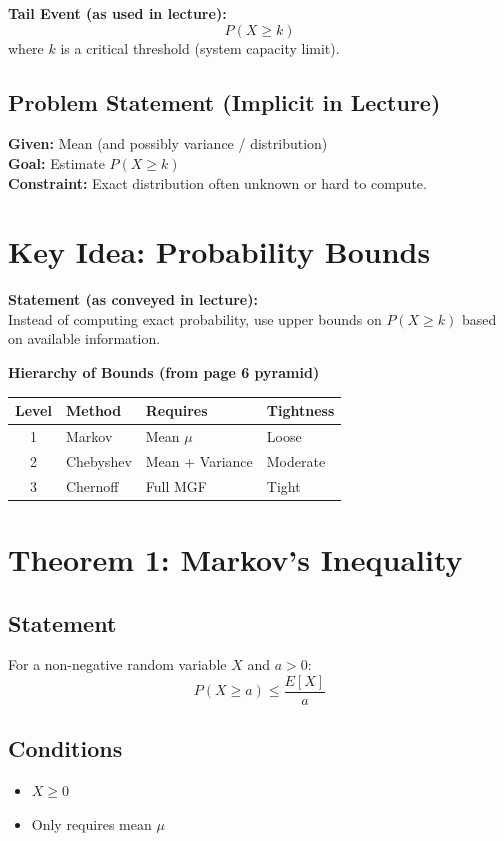 \documentclass[11pt]{article}
\begin{document}
\textbf{Tail Event (as used in lecture):}
\[ P(X \ge k) \]
where $k$ is a critical threshold (system capacity limit).

\subsection{Problem Statement (Implicit in Lecture)}
\textbf{Given:} Mean (and possibly variance / distribution) \\
\textbf{Goal:} Estimate $P(X \ge k)$ \\
\textbf{Constraint:} Exact distribution often unknown or hard to compute.

\section{Key Idea: Probability Bounds}
\textbf{Statement (as conveyed in lecture):} \\
Instead of computing exact probability, use upper bounds on $P(X \ge k)$ based on available information.

\vspace{0.3cm}
\noindent\textbf{Hierarchy of Bounds (from page 6 pyramid)}
\begin{center}
\renewcommand{\arraystretch}{1.3}
\begin{tabular}{|c|l|l|l|}
\hline
\textbf{Level} & \textbf{Method} & \textbf{Requires} & \textbf{Tightness} \\
\hline
1 & Markov & Mean $\mu$ & Loose \\
2 & Chebyshev & Mean + Variance & Moderate \\
3 & Chernoff & Full MGF & Tight \\
\hline
\end{tabular}
\end{center}

\section{Theorem 1: Markov’s Inequality}
\subsection{Statement}
For a non-negative random variable $X$ and $a > 0$:
\[ P(X \ge a) \le \frac{E[X]}{a} \]

\subsection{Conditions}
\begin{itemize}
    \item $X \ge 0$
    \item Only requires mean $\mu$
\end{itemize}
\end{document}
